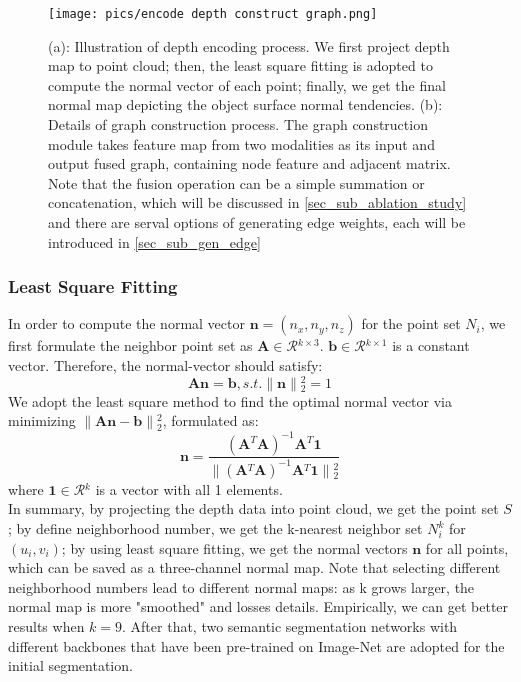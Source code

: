 ﻿\documentclass[journal]{IEEEtran}
\begin{document}
    \begin{figure*}
        \centering
        \texttt{[image: pics/encode depth construct graph.png]}
        \caption{(a): Illustration of depth encoding process. We first project depth map to point cloud; then, the least square fitting is adopted to compute the normal vector of each point; finally, we get the final normal map depicting the object surface normal tendencies. (b): Details of graph construction process. The graph construction module takes feature map from two modalities as its input and output fused graph, containing node feature and adjacent matrix. Note that the fusion operation can be a simple summation or concatenation, which will be discussed in \ref{sec_sub_ablation_study} and there are serval options of generating edge weights, each will be introduced in \ref{sec_sub_gen_edge} }
        \label{fig_depth_encoding_and_graph_construction}
    \end{figure*}
 
    \subsubsection{Least Square Fitting}  In order to compute the normal vector ${\mathbf{n}}= (n_{x},n_{y},n_{z})$ for the point set $N_{i}$, we first formulate the neighbor point set as $\mathbf{A} \in \mathcal{R}{^{k \times 3}}$. $\mathbf{b} \in \mathcal{R}{^{k \times 1}}$ is a constant vector. Therefore, the normal-vector should satisfy:
    \begin{equation}
    \mathbf{A}{\mathbf{n}}=\mathbf{b}, s.t.\|{\mathbf{n}}\|{_2^2}=1
    \end{equation}
    We adopt the least square method to find the optimal normal vector via minimizing $ \|\mathbf{A}{\mathbf{n}}-\mathbf{b}\|{_2^2}$, formulated as:
    \begin{equation}
    \mathbf{n}=\frac{(\mathbf{A}{^T}\mathbf{A})^{-1}\mathbf{A}{^T}\mathbf{1}}{\|(\mathbf{A}{^T}\mathbf{A})^{-1}\mathbf{A}{^T}\mathbf{1}\|{_2^2}} 
    \end{equation}
    where $\mathbf{1}\in \mathcal{R}{^k}$ is a vector with all 1 elements.  \\

 
    In summary, by projecting the depth data into point cloud, we get the point set $S$; by define neighborhood number, we get the k-nearest neighbor set $N_i^k$ for $(u_i, v_i)$; by using least square fitting, we get the normal vectors $ \mathbf{n}$ for all points, which can be saved as a three-channel normal map. Note that selecting different neighborhood numbers lead to different normal maps: as k grows larger, the normal map is more "smoothed" and losses details. Empirically, we can get better results when $k=9$. After that, two semantic segmentation networks with different backbones that have been pre-trained on Image-Net are adopted for the initial segmentation.
\end{document}
